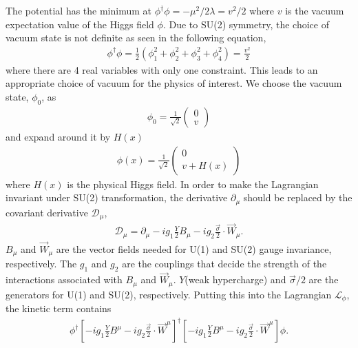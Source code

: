 The potential has the minimum at 
$ \phi^\dagger \phi = -\mu^2/2\lambda = v^2/2$ where 
$v$ is the vacuum expectation value of the Higgs field $\phi$.
Due to SU(2) symmetry, the choice of vacuum state is not definite 
as seen in the following equation, 
\begin{eqnarray} 
\phi^\dagger \phi 
= 
\frac{1}{2} \left( \phi_1^2 + \phi_2^2 + \phi_3^2 + \phi_4^2\right) 
=
\frac{v^2}{2} 
\end{eqnarray}
where there are 4 real variables with only one constraint. 
This leads to an appropriate choice of vacuum for the physics of interest. 
We choose the vacuum state, $\phi_0$, as 
\begin{eqnarray} 
\phi_0 = \frac{1}{\sqrt{2}} \left(  \begin{array}{c} 0 \\ v \end{array} \right)
\end{eqnarray} 
and expand around it by $H(x)$
\begin{eqnarray} 
\label{eq:HiggsfieldSSB}
\phi(x) = \frac{1}{\sqrt{2}} \left(  \begin{array}{c} 0 \\ v + H(x) \end{array} \right)
\end{eqnarray} 
where $H(x)$ is the physical Higgs field.  
In order to make the Lagrangian invariant under SU(2) transformation,
the derivative $\partial_\mu$ should be replaced by the covariant 
derivative $\mathcal{D}_\mu$,
\begin{eqnarray} 
\mathcal{D}_\mu 
= 
\partial_\mu - ig_1 \frac{Y}{2} B_\mu - ig_2 \frac{\vec{\sigma}}{2} \cdot \overrightarrow{W}_\mu. 
\end{eqnarray} 
$B_\mu$ and $\overrightarrow{W}_\mu$ are the vector fields needed for U(1) and 
SU(2) gauge invariance, respectively. 
The $g_1$ and $g_2$ are the couplings that decide the strength of the
interactions associated with $B_\mu$ and $\overrightarrow{W}_\mu$. 
$Y$(weak hypercharge) and $\vec{\sigma}/2$ are the generators for U(1) and SU(2), respectively. 
Putting this into the Lagrangian $\mathcal{L_\phi}$, the kinetic term contains 
\begin{eqnarray}
\label{eq:kintermHiggsLag}
\phi^\dagger 
\left[ - ig_1 \frac{Y}{2} B^\mu
       - ig_2 \frac{\vec{\sigma}}{2} \cdot \overrightarrow{W}^\mu \right]^\dagger 
\left[ - ig_1 \frac{Y}{2} B^\mu
       - ig_2 \frac{\vec{\sigma}}{2} \cdot \overrightarrow{W}^\mu \right] 
\phi.  
\end{eqnarray}
